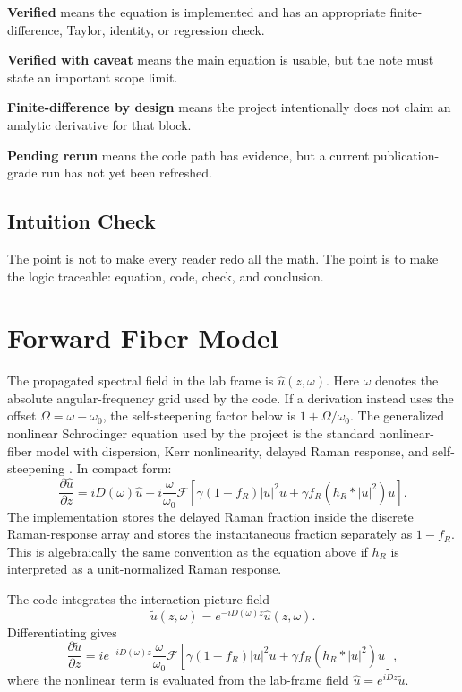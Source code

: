 \documentclass[11pt]{article}
\newcommand{\uhat}{\hat{u}}
\newcommand{\utilde}{\tilde{u}}
\newcommand{\Omegaoff}{\Omega}
\begin{document}
\textbf{Verified} means the equation is implemented and has an appropriate
finite-difference, Taylor, identity, or regression check.

\textbf{Verified with caveat} means the main equation is usable, but the note
must state an important scope limit.

\textbf{Finite-difference by design} means the project intentionally does not
claim an analytic derivative for that block.

\textbf{Pending rerun} means the code path has evidence, but a current
publication-grade run has not yet been refreshed.

\subsection*{Intuition Check}

The point is not to make every reader redo all the math. The point is to make
the logic traceable: equation, code, check, and conclusion.

\section{Forward Fiber Model}

The propagated spectral field in the lab frame is \(\uhat(z,\omega)\). Here
\(\omega\) denotes the absolute angular-frequency grid used by the code. If a
derivation instead uses the offset \(\Omegaoff=\omega-\omega_0\), the
self-steepening factor below is \(1+\Omegaoff/\omega_0\). The
generalized nonlinear Schrodinger equation used by the project is the standard
nonlinear-fiber model with dispersion, Kerr nonlinearity, delayed Raman
response, and self-steepening \cite{agrawal2019,hult2007}. In compact form:
\[
    \frac{\partial \uhat}{\partial z}
    =
    iD(\omega)\uhat
    +
    i\frac{\omega}{\omega_0}
    \mathcal{F}\!\left[
      \gamma(1-f_R)|u|^2u
      +\gamma f_R(h_R * |u|^2)u
    \right].
\]
The implementation stores the delayed Raman fraction inside the discrete
Raman-response array and stores the instantaneous fraction separately as
\(1-f_R\). This is algebraically the same convention as the equation above if
\(h_R\) is interpreted as a unit-normalized Raman response.

The code integrates the interaction-picture field
\[
    \utilde(z,\omega)=e^{-iD(\omega)z}\uhat(z,\omega).
\]
Differentiating gives
\[
    \frac{\partial \utilde}{\partial z}
    =
    i e^{-iD(\omega)z}
    \frac{\omega}{\omega_0}
    \mathcal{F}\!\left[
      \gamma(1-f_R)|u|^2u
      +\gamma f_R(h_R * |u|^2)u
    \right],
\]
where the nonlinear term is evaluated from the lab-frame field
\(\uhat=e^{iDz}\utilde\).
\end{document}

